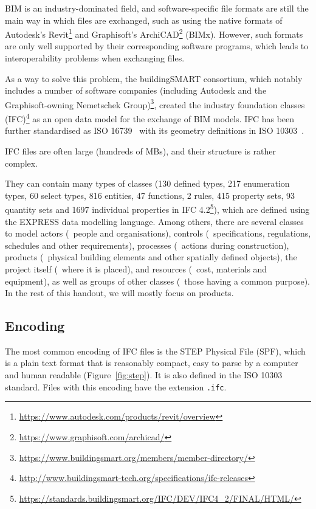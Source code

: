 BIM is an industry-dominated field, and software-specific file formats are still the main way in which files are exchanged, such as using the native formats of Autodesk's Revit\footnote{\url{https://www.autodesk.com/products/revit/overview}} and Graphisoft's ArchiCAD\footnote{\url{https://www.graphisoft.com/archicad/}} (BIMx).
However, such formats are only well supported by their corresponding software programs, which leads to interoperability problems when exchanging files.

As a way to solve this problem, the buildingSMART consortium, which notably includes a number of software companies (including Autodesk and the Graphisoft-owning Nemetschek Group)\footnote{\url{https://www.buildingsmart.org/members/member-directory/}}, created the industry foundation classes (IFC)\footnote{\url{http://www.buildingsmart-tech.org/specifications/ifc-releases}} as an open data model for the exchange of BIM models.
IFC has been further standardised as ISO 16739~\citep{ISO16739:2013} with its geometry definitions in ISO 10303~\citep{ISO10303:2014}.

IFC files are often large (hundreds of MBs), and their structure is rather complex.

They can contain many types of classes (130 defined types, 217 enumeration types, 60 select types, 816 entities, 47 functions, 2 rules, 415 property sets, 93 quantity sets and 1697 individual properties in IFC 4.2\footnote{\url{https://standards.buildingsmart.org/IFC/DEV/IFC4_2/FINAL/HTML/}}), which are defined using the EXPRESS data modelling language.
Among others, there are several classes to model actors (\eg\ people and organisations), controls (\eg\ specifications, regulations, schedules and other requirements), processes (\eg\ actions during construction), products (\eg\ physical building elements and other spatially defined objects), the project itself (\eg\ where it is placed), and resources (\eg\ cost, materials and equipment), as well as groups of other classes (\eg\ those having a common purpose).
In the rest of this handout, we will mostly focus on products.

\subsection{Encoding}

The most common encoding of IFC files is the STEP Physical File (SPF), which is a plain text format that is reasonably compact, easy to parse by a computer and human readable (Figure~\ref{fig:step}).
It is also defined in the ISO 10303 standard.
Files with this encoding have the extension \texttt{.ifc}.

